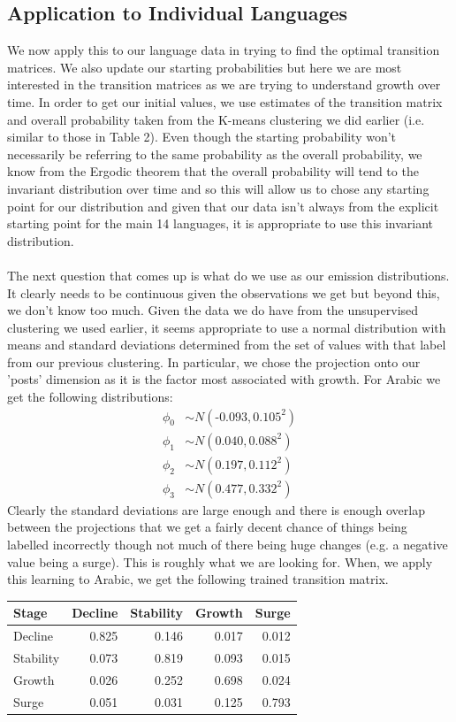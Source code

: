 \documentclass[12pt]{article}
\begin{document}
\subsection{Application to Individual Languages}
We now apply this to our language data in trying to find the optimal transition matrices. We also update our starting probabilities but here we are most interested in the transition matrices as we are trying to understand growth over time. In order to get our initial values, we use estimates of the transition matrix and overall probability taken from the K-means clustering we did earlier (i.e. similar to those in Table 2). Even though the starting probability won't necessarily be referring to the same probability as the overall probability, we know from the Ergodic theorem that the overall probability will tend to the invariant distribution over time and so this will allow us to chose any starting point for our distribution and given that our data isn't always from the explicit starting point for the main 14 languages, it is appropriate to use this invariant distribution.\\\\
The next question that comes up is what do we use as our emission distributions. It clearly needs to be continuous given the observations we get but beyond this, we don't know too much. Given the data we do have from the unsupervised clustering we used earlier, it seems appropriate to use a normal distribution with means and standard deviations determined from the set of values with that label from our previous clustering. In particular, we chose the projection onto our 'posts' dimension as it is the factor most associated with growth. For Arabic we get the following distributions:
\begin{align*}
\phi_0 &\sim N(\mbox{-}0.093,0.105^2)\\
\phi_1 &\sim N(0.040,0.088^2)\\
\phi_2 &\sim N(0.197,0.112^2)\\
\phi_3 &\sim N(0.477,0.332^2)
\end{align*}
Clearly the standard deviations are large enough and there is enough overlap between the projections that we get a fairly decent chance of things being labelled incorrectly though not much of there being huge changes (e.g. a negative value being a surge). This is roughly what we are looking for. When, we apply this learning to Arabic, we get the following trained transition matrix.
\begin{center}
\begin{tabular}{lrrrr}
\toprule
Stage & Decline &  Stability & Growth & Surge \\
\midrule
Decline &  0.825 &  0.146 &  0.017 &  0.012 \\
Stability &  0.073 &  0.819 &  0.093 &  0.015 \\
Growth &  0.026 &  0.252 &  0.698 &  0.024 \\
Surge &  0.051 &  0.031 &  0.125 &  0.793 \\
\bottomrule
\end{tabular}
\end{center}
\end{document}
